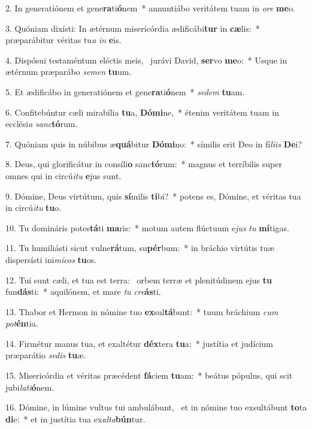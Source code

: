 2. In generatiónem et gene\textbf{ra}ti\textbf{ó}nem~*  annuntiábo veritátem tuam in \textit{o}\textit{re} \textbf{me}o.\

3. Quóniam dixísti: In ætérnum misericórdia ædificábi\textbf{tur} in \textbf{cæ}lis:~*  præparábitur véritas tu\textit{a} \textit{in} \textbf{e}is.\

4. Dispósui testaméntum eléctis meis, \dag\  jurávi David, \textbf{ser}vo \textbf{me}o:~*  Usque in ætérnum præparábo \textit{se}\textit{men} \textbf{tu}um.\

5. Et ædificábo in generatiónem et gene\textbf{ra}ti\textbf{ó}nem~*  \textit{se}\textit{dem} \textbf{tu}am.\

6. Confitebúntur cæli mirabília \textbf{tu}a, \textbf{Dó}\textbf{mi}ne,~*  étenim veritátem tuam in ecclési\textit{a} \textit{sanc}\textbf{tó}rum.\

7. Quóniam quis in núbibus æ\textbf{quá}bitur \textbf{Dó}\textbf{mi}no:~*  símilis erit Deo in fí\textit{li}\textit{is} \textbf{De}i?\

8. Deus, qui glorificátur in consíli\textbf{o} sanc\textbf{tó}rum:~*  magnus et terríbilis super omnes qui in circú\textit{i}\textit{tu} \textbf{e}jus sunt.\

9. Dómine, Deus virtútum, quis \textbf{sí}milis \textbf{ti}bi?~*  potens es, Dómine, et véritas tua in circú\textit{i}\textit{tu} \textbf{tu}o.\

10. Tu domináris potes\textbf{tá}ti \textbf{ma}ris:~*  motum autem flúctuum e\textit{jus} \textit{tu} \textbf{mí}tigas.\

11. Tu humiliásti sicut vulne\textbf{rá}tum, su\textbf{pér}bum:~*  in bráchio virtútis tuæ dispersísti ini\textit{mí}\textit{cos} \textbf{tu}os.\

12. Tui sunt cæli, et tua est terra: \dag\  orbem terræ et plenitúdinem ejus \textbf{tu} fun\textbf{dás}ti:~*  aquilónem, et mare \textit{tu} \textit{cre}\textbf{ás}ti.\

13. Thabor et Hermon in nómine tuo \textbf{ex}sul\textbf{tá}bunt:~*  tuum bráchium \textit{cum} \textit{pot}\textbf{én}tia.\

14. Firmétur manus tua, et exaltétur \textbf{déx}tera \textbf{tu}a:~*  justítia et judícium præparátio \textit{se}\textit{dis} \textbf{tu}æ.\

15. Misericórdia et véritas præcédent \textbf{fá}ciem \textbf{tu}am:~*  beátus pópulus, qui scit jubi\textit{la}\textit{ti}\textbf{ó}nem.\

16. Dómine, in lúmine vultus tui ambulábunt, \dag\  et in nómine tuo exsultábunt \textbf{to}ta \textbf{di}e:~*  et in justítia tua ex\textit{al}\textit{ta}\textbf{bún}tur.\

